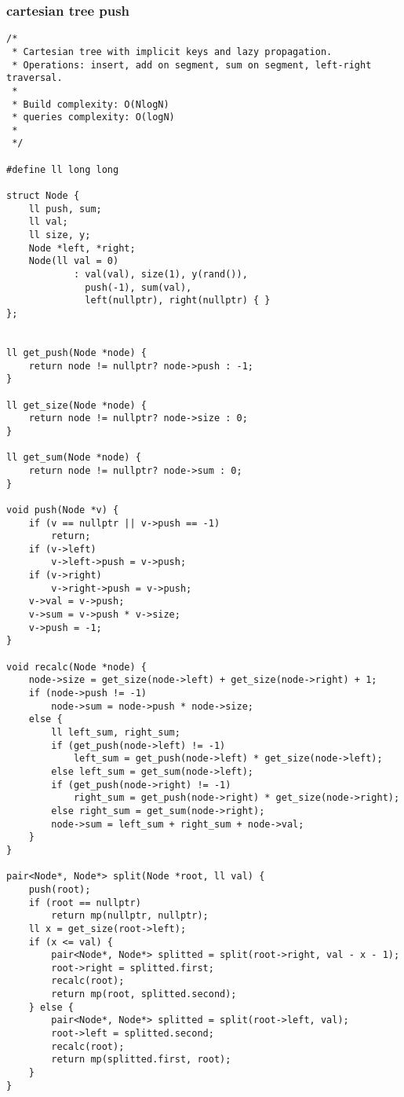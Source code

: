 \subsubsection{cartesian tree push}
\begin{lstlisting}
/*
 * Cartesian tree with implicit keys and lazy propagation.
 * Operations: insert, add on segment, sum on segment, left-right traversal.
 *
 * Build complexity: O(NlogN)
 * queries complexity: O(logN)
 *
 */

#define ll long long

struct Node {
    ll push, sum;
    ll val;
    ll size, y;
    Node *left, *right;
    Node(ll val = 0)
            : val(val), size(1), y(rand()),
              push(-1), sum(val),
              left(nullptr), right(nullptr) { }
};


ll get_push(Node *node) {
    return node != nullptr? node->push : -1;
}

ll get_size(Node *node) {
    return node != nullptr? node->size : 0;
}

ll get_sum(Node *node) {
    return node != nullptr? node->sum : 0;
}

void push(Node *v) {
    if (v == nullptr || v->push == -1)
        return;
    if (v->left)
        v->left->push = v->push;
    if (v->right)
        v->right->push = v->push;
    v->val = v->push;
    v->sum = v->push * v->size;
    v->push = -1;
}

void recalc(Node *node) {
    node->size = get_size(node->left) + get_size(node->right) + 1;
    if (node->push != -1)
        node->sum = node->push * node->size;
    else {
        ll left_sum, right_sum;
        if (get_push(node->left) != -1)
            left_sum = get_push(node->left) * get_size(node->left);
        else left_sum = get_sum(node->left);
        if (get_push(node->right) != -1)
            right_sum = get_push(node->right) * get_size(node->right);
        else right_sum = get_sum(node->right);
        node->sum = left_sum + right_sum + node->val;
    }
}

pair<Node*, Node*> split(Node *root, ll val) {
    push(root);
    if (root == nullptr)
        return mp(nullptr, nullptr);
    ll x = get_size(root->left);
    if (x <= val) {
        pair<Node*, Node*> splitted = split(root->right, val - x - 1);
        root->right = splitted.first;
        recalc(root);
        return mp(root, splitted.second);
    } else {
        pair<Node*, Node*> splitted = split(root->left, val);
        root->left = splitted.second;
        recalc(root);
        return mp(splitted.first, root);
    }
}


\end{lstlisting}
